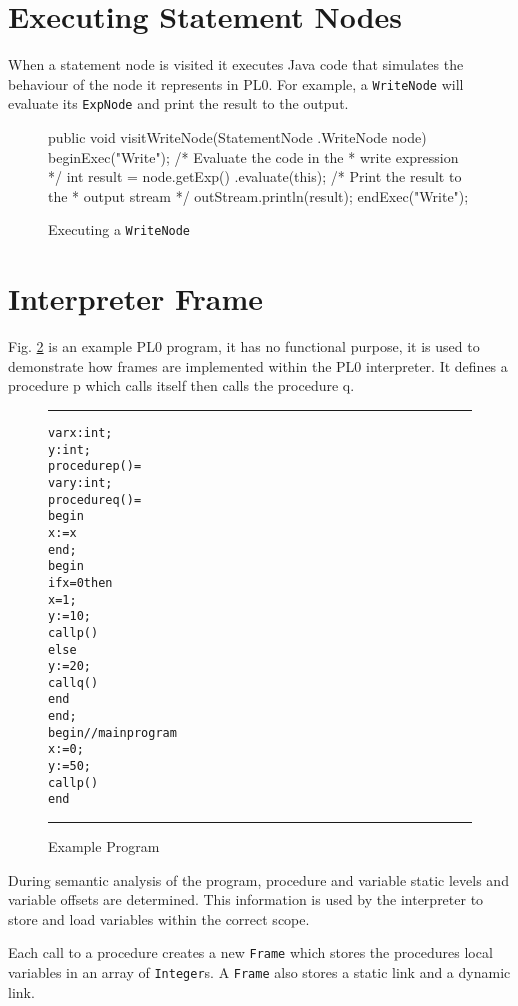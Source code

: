 \documentclass[a4paper,twoside,twocolumn]{article}
\begin{document}
\section{Executing Statement Nodes}\label{section:statements}
When a statement node is visited it executes Java code that simulates the
behaviour of the node it represents in PL0. For example, a \texttt{WriteNode}
will evaluate its \texttt{ExpNode} and print the result to the output.

\begin{figure}[H]
\begin{java}
public void visitWriteNode(StatementNode
        .WriteNode node) {
    beginExec("Write");
    /* Evaluate the code in the
     * write expression */
    int result = node.getExp()
            .evaluate(this);
    /* Print the result to the 
     * output stream */
    outStream.println(result);
    endExec("Write");
}
\end{java}
\caption{Executing a \texttt{WriteNode}}\label{figure:writenode}
\end{figure}

\section{Interpreter Frame}\label{section:frame}

Fig. \ref{figure:exampleprog} is an example PL0 program, it has no functional
purpose, it is used to demonstrate how frames are implemented within the PL0
interpreter. It defines a procedure p which calls itself then calls the
procedure q.

\begin{figure}[H]
\rule{\columnwidth}{0.5pt}
\begin{alltt}
var x: int;
    y: int;
procedure p() =
  var y: int;
  procedure q() =
    begin
      x := x
    end;
  begin
    if x = 0 then
      x = 1;
      y := 10;
      call p()
    else
      y := 20;
      call q()
    end
  end;
begin // main program
  x := 0;
  y := 50;
  call p()
end
\end{alltt}
\rule{\columnwidth}{0.5pt}
\caption{Example Program}\label{figure:exampleprog}
\end{figure}

During semantic analysis of the program, procedure and variable static levels
and variable offsets are determined.
This information is used by the interpreter to store and load variables within
the correct scope.

Each call to a procedure creates a new \texttt{Frame} which stores the procedures
local variables in an array of \texttt{Integer}s. A \texttt{Frame} also stores
a static link and a dynamic link.
\end{document}
